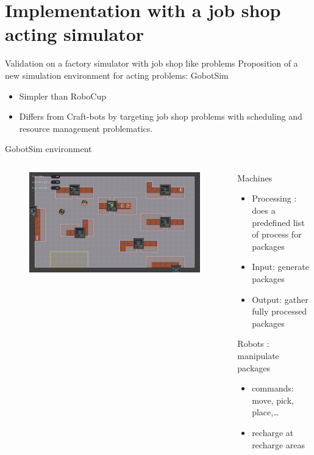 \section{Implementation with a job shop acting simulator}
\begin{frame}{Validation on a factory simulator with job shop like problems}
    Proposition of a new simulation environment for acting problems: GobotSim
    \begin{itemize}
        \item Simpler than RoboCup
        \item Differs from Craft-bots by targeting job shop problems with scheduling and resource management problematics.
    \end{itemize}
\end{frame}

\begin{frame}{GobotSim environment}
\begin{columns}
    \begin{column}{0.4\textwidth}
        \begin{figure}[tp]
            \includegraphics[width=\linewidth]{images/gobot-rae.png}
        \end{figure}
    \end{column}
    \begin{column}{0.5\textwidth}
        Machines
        \begin{itemize}
            \item Processing : does a predefined list of process for packages
            \item Input: generate packages
            \item Output: gather fully processed packages
        \end{itemize}
        Robots : manipulate packages
        \begin{itemize}
            \item commands: move, pick, place,\dots
            \item recharge at recharge areas
        \end{itemize}
    \end{column}
\end{columns}
\end{frame}

